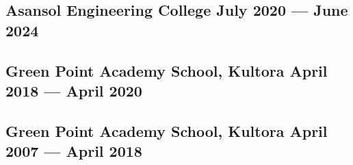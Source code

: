 \subsection{{Asansol Engineering College \hfill July 2020 --- June 2024}}
\begin{null}

\end{null}

\subsection{{Green Point Academy School, Kultora \hfill April 2018 --- April 2020}}
\begin{null}

\end{null}

\subsection{{Green Point Academy School, Kultora \hfill April 2007 --- April 2018}}
\begin{null}

\end{null}